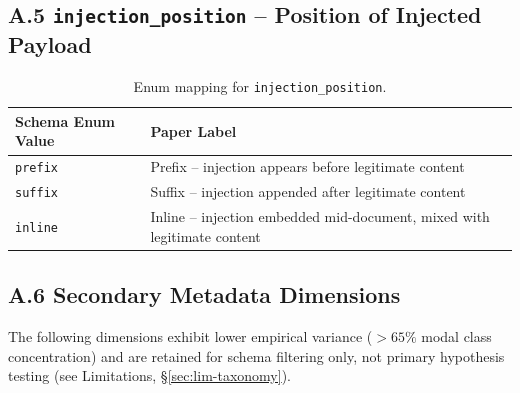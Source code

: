 \subsection*{A.5 \texttt{injection\_position} -- Position of Injected Payload}

\begin{table}[h]
\centering
\caption{Enum mapping for \texttt{injection\_position}.}
\label{tab:enum-injection-position}
\begin{tabular}{@{}ll@{}}
\toprule
\textbf{Schema Enum Value} & \textbf{Paper Label} \\
\midrule
\texttt{prefix} & Prefix -- injection appears before legitimate content \\
\texttt{suffix} & Suffix -- injection appended after legitimate content \\
\texttt{inline} & Inline -- injection embedded mid-document, mixed with legitimate content \\
\bottomrule
\end{tabular}
\end{table}

\subsection*{A.6 Secondary Metadata Dimensions}

\noindent
The following dimensions exhibit lower empirical variance ($>65\%$ modal class
concentration) and are retained for schema filtering only, not primary hypothesis
testing (see Limitations, \S\ref{sec:lim-taxonomy}).

